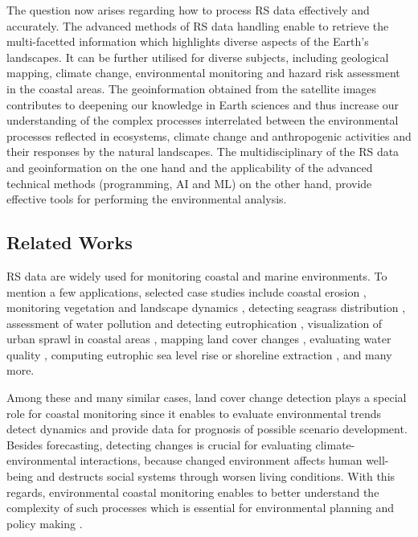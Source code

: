 \documentclass[jmse,article,submit,pdftex,moreauthors]{Definitions/mdpi}
\begin{document}
The question now arises regarding how to process RS data effectively and accurately. The advanced methods of RS data handling enable to retrieve the multi-facetted information which highlights diverse aspects of the Earth's landscapes. It can be further utilised for diverse subjects, including geological mapping, climate change, environmental monitoring and hazard risk assessment in the coastal areas. The geoinformation obtained from the satellite images contributes to deepening our knowledge in Earth sciences and thus increase our understanding of the complex processes interrelated between the environmental processes reflected in ecosystems, climate change and anthropogenic activities and their responses by the natural landscapes. The multidisciplinary of the RS data and geoinformation on the one hand and the applicability of the advanced technical methods (programming, AI and ML) on the other hand, provide effective tools for performing the environmental analysis. 

\subsection{Related Works}

RS data are widely used for monitoring coastal and marine environments. To mention a few applications, selected case studies include coastal erosion \cite{MCCARROLL2024107146}, monitoring vegetation and landscape dynamics \cite{Munroe2022,Morgan}, detecting seagrass distribution \cite{Traganos}, assessment of water pollution and detecting eutrophication \cite{ZHU2024262}, visualization of urban sprawl in coastal areas \cite{su14095700}, mapping land cover changes \cite{Lemenkova202313}, evaluating water quality \cite{ZHU2022116187,Lemenkova202322,Kim}, computing eutrophic sea level rise or shoreline extraction \cite{MCALLISTER2022104102}, and many more. 

Among these and many similar cases, land cover change detection plays a special role for coastal monitoring since it enables to evaluate environmental trends detect dynamics and provide data for prognosis of possible scenario development. Besides forecasting, detecting changes is crucial for evaluating climate-environmental interactions, because changed environment affects human well-being and destructs social systems through worsen living conditions. With this regards, environmental coastal monitoring enables to better understand the complexity of such processes which is essential for environmental planning and policy making \cite{MURRAY2000357,COUTTS2016637}.
\end{document}
